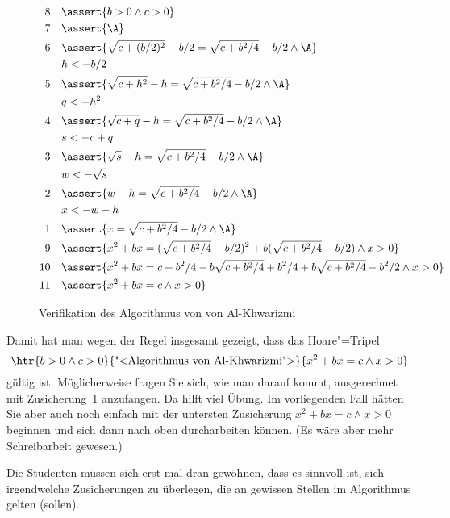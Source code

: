 \begin{figure}[ht]
  \begin{align*}
    8&&&\assert{b>0 \land c>0} \\
    7&&&\assert{\A} \\
    6&&&\assert{\sqrt{c+(b/2)^2}-b/2 = \sqrt{c + b^2/4} - b/2 \land \A } \notag \\
     &&&h <- b/2  \\
    5&&&\assert{\sqrt{c+h^2}-h = \sqrt{c + b^2/4} - b/2 \land \A } \notag \\
     &&&q <- h^2 \\
    4&&&\assert{\sqrt{c+\smash[b]q}-h = \sqrt{c + b^2/4} - b/2  \land \A }  \notag \\
     &&&s <- c+q \\
    3&&&\assert{\sqrt{s}-h = \sqrt{c + b^2/4} - b/2 \land \A } \notag \\
     &&&w <- \sqrt{s} \\
    2&&&\assert{w-h = \sqrt{c + b^2/4} - b/2 \land \A} \notag \\
     &&&x <- w-h   \\
    1&&&\assert{ x = \sqrt{c + b^2/4} - b/2 \land \A } \notag  \\
    9&&&\assert{ x^2+bx = (\sqrt{c + b^2/4} - b/2)^2 +b(\sqrt{c + b^2/4} - b/2) \land x>0} \notag \\
    10&&&\assert{x^2+bx = {c + b^2/4} - b\sqrt{c + b^2/4} +b^2/4 +b\sqrt{c + b^2/4} - b^2/2 \land x>0} \notag \\
    11&&&\assert{x^2+bx = c \land x>0} \notag 
  \end{align*}
  \caption{Verifikation des Algorithmus von von Al-Khwarizmi}
  \label{fig:verifikation:al-khwarizmi}
\end{figure}
% 
Damit hat man wegen der Regel  insgesamt gezeigt, dass das Hoare"=Tripel
\[
\htr{b>0 \land c>0}{\hbox{"<Algorithmus von Al-Khwarizmi">}}{x^2+bx = c \land x>0}
\]
gültig ist.
%
Möglicherweise fragen Sie sich, wie man darauf kommt, ausgerechnet mit
Zusicherung~1 anzufangen.
%
Da hilft viel Übung.
%
Im vorliegenden Fall hätten Sie aber auch noch einfach mit der untersten
Zusicherung $x^2+bx = c \land x>0$ beginnen und sich dann nach oben
durcharbeiten können.
%
(Es wäre aber mehr Schreibarbeit gewesen.)

\begin{tutorium}
  Die Studenten müssen sich erst mal dran gewöhnen, dass es sinnvoll ist, sich
  irgendwelche Zusicherungen zu überlegen, die an gewissen Stellen im
  Algorithmus gelten (sollen).
\end{tutorium}

